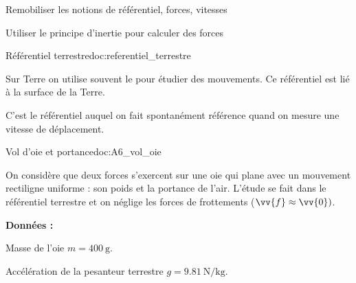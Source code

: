 \teteSndMouv




\begin{objectifs}
  \item Remobiliser les notions de référentiel, forces, vitesses
  \item Utiliser le principe d'inertie pour calculer des forces
\end{objectifs}


\begin{doc}{Référentiel terrestre}{doc:referentiel_terrestre}
  \begin{importants}
    Sur Terre on utilise souvent le  pour étudier des mouvements. Ce référentiel est lié à la surface de la Terre.
  \end{importants}
  C'est le référentiel auquel on fait spontanément référence quand on mesure une vitesse de déplacement.
\end{doc}



\begin{doc}{Vol d'oie et portance}{doc:A6_vol_oie}
  \begin{center}
  \end{center}
  
  
  On considère que deux forces s'exercent sur une oie qui plane avec un mouvement rectiligne uniforme : son poids et la portance de l'air.
  L'étude se fait dans le référentiel terrestre et on néglige les forces de frottements ($\vv{f} \approx \vv{0})$.

  \textbf{Données :}
  \begin{listePoints}
    \item Masse de l'oie $m = \qty{400}{\g}$.
    \item Accélération de la pesanteur terrestre $g = \qty{9,81}{\newton \per\kg}$.
  \end{listePoints}
\end{doc}





